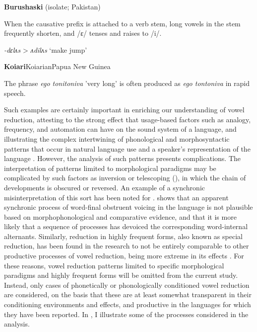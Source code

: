 \ea\label{ex:6.4}
   \textbf{Burushaski} (isolate; Pakistan)

When the causative prefix is attached to a verb stem, long vowels in the stem frequently shorten, and /ɛ/ tenses and raises to /i/.

\textit{-dɛlʌs} > \textit{ʌdilʌs} ‘make jump’
\citep[1030]{Anderson1997}
\z

\ea\label{ex:6.5}
 \textbf{Koiari}{Koiarian}{Papua New Guinea}

The phrase \textit{ego tonitoniva} ’very long’ is often produced as \textit{ego tontoniva} in rapid speech.
\citep[7]{Dutton1996}
\z

  Such examples are certainly important in enriching our understanding of vowel reduction, attesting to the strong effect that usage-based factors such as analogy, frequency, and automation can have on the sound system of a language, and illustrating the complex intertwining of phonological and morphosyntactic patterns that occur in natural language use and a speaker’s representation of the language \citep{Bybee2001}. However, the analysis of such patterns presents complications. The interpretation of patterns limited to morphological paradigms may be complicated by such factors as inversion or telescoping (\citealt{Vennemann1972,Hyman1975}), in which the chain of developments is obscured or reversed. An example of a synchronic misinterpretation of this sort has been noted for . \citet{Yu2004} shows that an apparent synchronic process of word-final obstruent voicing in the language is not plausible based on morphophonological and comparative evidence, and that it is more likely that a sequence of processes has devoiced the corresponding word-internal alternants. Similarly, reduction in highly frequent forms, also known as special reduction, has been found in the research to not be entirely comparable to other productive processes of vowel reduction, being more extreme in its effects \citep{BybeeEtAl2016}. For these reasons, vowel reduction patterns limited to specific morphological paradigms and highly frequent forms will be omitted from the current study. Instead, only cases of phonetically or phonologically conditioned vowel reduction are considered, on the basis that these are at least somewhat transparent in their conditioning environments and effects, and productive in the languages for which they have been reported. In , I illustrate some of the processes considered in the analysis.

\ea\label{ex:6.6}

